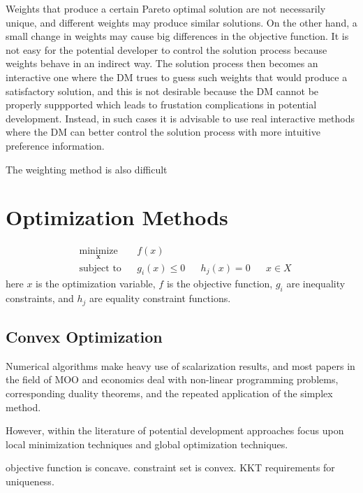 Weights that produce a certain Pareto optimal solution are not necessarily unique, and different weights may produce similar solutions.  On the other hand, a small change in weights may cause big differences in the objective function.  It is not easy for the potential developer to control the solution process because weights behave in an indirect way.  The solution process then becomes an interactive one where the DM trues to guess such weights that would produce a satisfactory solution, and this is not desirable because the DM cannot be properly suppported which leads to frustation complications in potential development.  Instead, in such cases it is advisable to use real interactive methods where the DM can better control the solution process with more intuitive preference information.

The weighting method is also difficult

\section{Optimization Methods}

\begin{equation}
  \begin{aligned}
  & \underset{\bm{x}}{\text{minimize}}
        & &  f(x)\\
  & \text{subject to}
        & & g_i(x) \leq 0
        & & h_j(x) = 0
        & & x \in X
  \end{aligned}
\end{equation}
here $x$ is the optimization variable, $f$ is the objective function, $g_i$ are inequality constraints, and $h_j$ are equality constraint functions.

\subsection{Convex Optimization}
Numerical algorithms make heavy use of scalarization results, and most papers in the field of MOO and economics deal with non-linear programming problems, corresponding duality theorems, and the repeated application of the simplex method.

However, within the literature of potential development approaches focus upon local minimization techniques and global optimization techniques.

objective function is concave.  constraint set is convex.  KKT requirements for uniqueness.

